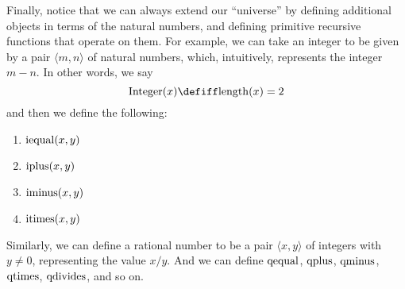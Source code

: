 \documentclass[../../include/open-logic-section]{subfiles}
\begin{document}
Finally, notice that we can always extend our ``universe'' by defining
additional objects in terms of the natural numbers, and defining
primitive recursive functions that operate on them. For example, we
can take an integer to be given by a pair $\langle m, n \rangle$ of natural
numbers, which, intuitively, represents the integer $m-n$. In other
words, we say
\[
\fn{Integer}(x) \defiff \fn{length}(x) = 2
\]
and then we define the following:
\begin{enumerate}
\item $\mathrm{iequal}(x,y)$
\item $\mathrm{iplus}(x,y)$
\item $\mathrm{iminus}(x,y)$
\item $\mathrm{itimes}(x,y)$
\end{enumerate}
Similarly, we can define a rational number to be a pair $\langle x, y \rangle$
of integers with $y \neq 0$, representing the value $x / y$. And we
can define $\mathrm{qequal}$, $\mathrm{qplus}$, $\mathrm{qminus}$, $\mathrm{qtimes}$,
$\mathrm{qdivides}$, and so on.
\end{document}
